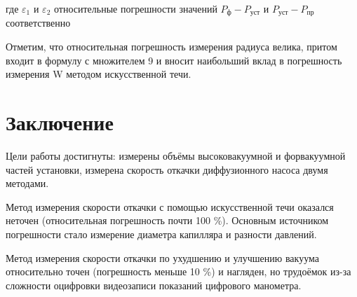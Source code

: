 \documentclass[14pt]{article}
\begin{document}
	где $\varepsilon_1$ и $\varepsilon_2$ относительные погрешности значений $P_ф - P_{уст}$ и $P_{уст} - P_{пр}$ соответственно
	
	
	Отметим, что относительная погрешность измерения радиуса велика, притом входит в формулу с множителем 9 и вносит наибольший вклад в погрешность измерения W методом искусственной течи.
	
	
	
	
	\section*{Заключение}
	
	\hspace{4mm} Цели работы достигнуты: измерены объёмы высоковакуумной и форвакуумной частей установки, измерена скорость откачки диффузионного насоса двумя методами.
	
	Метод измерения скорости откачки с помощью искусственной течи оказался неточен (относительная погрешность почти 100 \%). Основным источником погрешности стало измерение диаметра капилляра и разности давлений. 
	
	Метод измерения скорости откачки по ухудшению и улучшению вакуума относительно точен (погрешность меньше 10 \%) и нагляден, но трудоёмок из-за сложности оцифровки видеозаписи показаний цифрового манометра.
	
	
\end{document}
